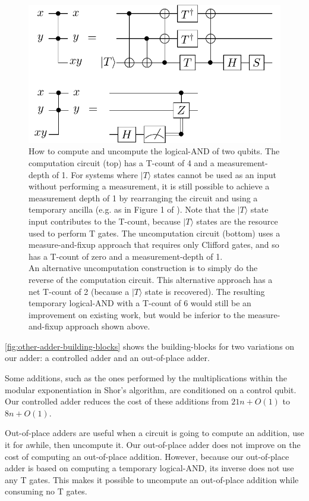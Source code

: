 \documentclass[twocolumn,accepted=2018-05-25]{quantumarticle}
\begin{document}
\begin{figure}
  \includegraphics[width=\linewidth]{temporary-logical-and.pdf}
  \caption{
	How to compute and uncompute the logical-AND of two qubits.
	The computation circuit (top) has a T-count of 4 and a measurement-depth of 1.
	For systems where $|T\rangle$ states cannot be used as an input without performing a measurement, it is still possible to achieve a measurement depth of 1 by rearranging the circuit and using a temporary ancilla (e.g. as in Figure 1 of \cite{Jones2013}).
	Note that the $|T\rangle$ state input contributes to the T-count, because $|T\rangle$ states are the resource used to perform T gates.
	The uncomputation circuit (bottom) uses a measure-and-fixup approach \cite{Jones2013} that requires only Clifford gates, and so has a T-count of zero and a measurement-depth of 1.
    \\
    An alternative uncomputation construction is to simply do the reverse of the computation circuit.
    This alternative approach has a net T-count of 2 (because a $|T\rangle$ state is recovered).
    The resulting temporary logical-AND with a T-count of 6 would still be an improvement on existing work, but would be inferior to the measure-and-fixup approach shown above.
  }
  \label{fig:temporary-logical-AND}
\end{figure}


\autoref{fig:other-adder-building-blocks} shows the building-blocks for two variations on our adder: a controlled adder and an out-of-place adder.

Some additions, such as the ones performed by the multiplications within the modular exponentiation in Shor's algorithm, are conditioned on a control qubit.
Our controlled adder reduces the cost of these additions from $21n + O(1)$ \cite{Coreas2017} to $8n + O(1)$.

Out-of-place adders are useful when a circuit is going to compute an addition, use it for awhile, then uncompute it.
Our out-of-place adder does not improve on the cost of computing an out-of-place addition.
However, because our out-of-place adder is based on computing a temporary logical-AND, its inverse does not use any T gates.
This makes it possible to uncompute an out-of-place addition while consuming no T gates.
\end{document}
